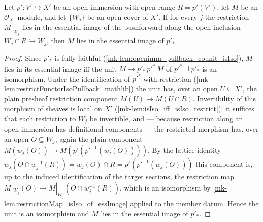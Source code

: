 \begin{lemma}\label{mk-lem:essimage_pushforward_cover_local}
  \leanok

  Let \(p' : V' \hookrightarrow X'\) be an open immersion with open range \(R = p'(V')\), let
  \(M\) be an \(\mathcal{O}_{X'}\)-module, and let \(\{W_j\}\) be an open cover of \(X'\).  If
  for every \(j\) the restriction \(M|_{W_j}\) lies in the essential image of the pushforward
  along the open inclusion \(W_j \cap R \hookrightarrow W_j\), then \(M\) lies in the essential
  image of \(p'_*\).
\end{lemma}
\begin{proof}
  \leanok{}
  Since \(p'_*\) is fully faithful (\ref{mk-lem:openimm_pullback_counit_isIso}), \(M\) lies in its
  essential image iff the unit \(M \to p'_*\,p'^*\,M\) of \(p'^* \dashv p'_*\) is an isomorphism.
  Under the identification of \(p'^*\) with restriction
  (\ref{mk-lem:restrictFunctorIsoPullback_mathlib}) the unit has, over an open \(U \subseteq X'\),
  the plain presheaf restriction component \(M(U) \to M(U \cap R)\).  Invertibility of this
  morphism of sheaves is local on \(X'\) (\ref{mk-lem:isIso_iff_isIso_restrict}): it suffices that
  each restriction to \(W_j\) be invertible, and — because restriction along an open immersion
  has definitional components — the restricted morphism has, over an open \(O \subseteq W_j\),
  again the plain component \(M(w_j(O)) \to M(p'(p'^{-1}(w_j(O))))\).  By the lattice identity
  \(w_j(O \cap w_j^{-1}(R)) = w_j(O) \cap R = p'(p'^{-1}(w_j(O)))\) this component is, up to the
  induced identification of the target sections, the restriction map
  \(M|_{W_j}(O) \to M|_{W_j}(O \cap w_j^{-1}(R))\), which is an isomorphism by
  \ref{mk-lem:restrictionMap_isIso_of_essImage} applied to the member datum.  Hence the unit is an
  isomorphism and \(M\) lies in the essential image of \(p'_*\).
\end{proof}


